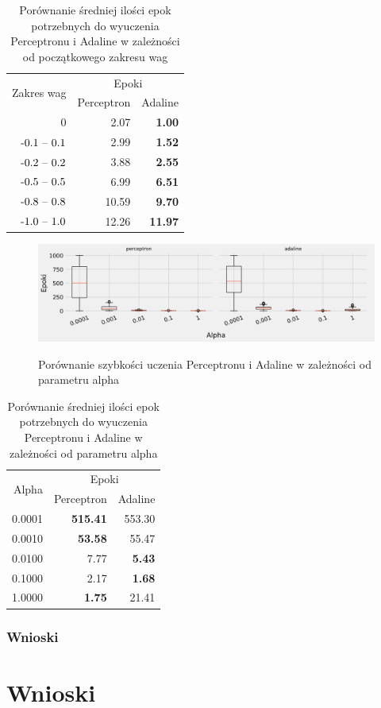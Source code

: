 \documentclass{article}
\begin{document}
\begin{table}[!h]
	\caption{Porównanie średniej ilości epok potrzebnych do wyuczenia Perceptronu i Adaline w zależności od początkowego zakresu wag}
	\label{tabela-res-81}
	\centering
	\begin{tabular}{rrr}
		\toprule
		\multirow{2}{*}{Zakres wag}   & \multicolumn{2}{c}{Epoki} \\
		                  & Perceptron & Adaline        \\
		\midrule
		0                 & 2.07       & \textbf{1.00}  \\
		\($-0.1 -- 0.1$\) & 2.99       & \textbf{1.52}  \\
		\($-0.2 -- 0.2$\) & 3.88       & \textbf{2.55}  \\
		\($-0.5 -- 0.5$\) & 6.99       & \textbf{6.51}  \\
		\($-0.8 -- 0.8$\) & 10.59      & \textbf{9.70}  \\
		\($-1.0 -- 1.0$\) & 12.26      & \textbf{11.97} \\
		\bottomrule
	\end{tabular}
\end{table}


\begin{figure}[!h]
	\centering
	\caption{Porównanie szybkości uczenia Perceptronu i Adaline w zależności od parametru alpha}
	\includegraphics[width=\textwidth]{ada_per_alpha.png}
	\label{fig:res82}
\end{figure}

\begin{table}[!h]
	\caption{Porównanie średniej ilości epok potrzebnych do wyuczenia Perceptronu i Adaline w zależności od parametru alpha}
	\label{tabela-res-82}
	\centering
	\begin{tabular}{rrr}
		\toprule
		\multirow{2}{*}{Alpha}   & \multicolumn{2}{c}{Epoki} \\
		       & Perceptron      & Adaline       \\
		\midrule
		0.0001 & \textbf{515.41} & 553.30        \\
		0.0010 & \textbf{53.58}  & 55.47         \\
		0.0100 & 7.77            & \textbf{5.43} \\
		0.1000 & 2.17            & \textbf{1.68} \\
		1.0000 & \textbf{1.75}   & 21.41         \\
		\bottomrule
	\end{tabular}
\end{table}

\subsubsection*{Wnioski}

\newpage
\section{Wnioski}
\end{document}
